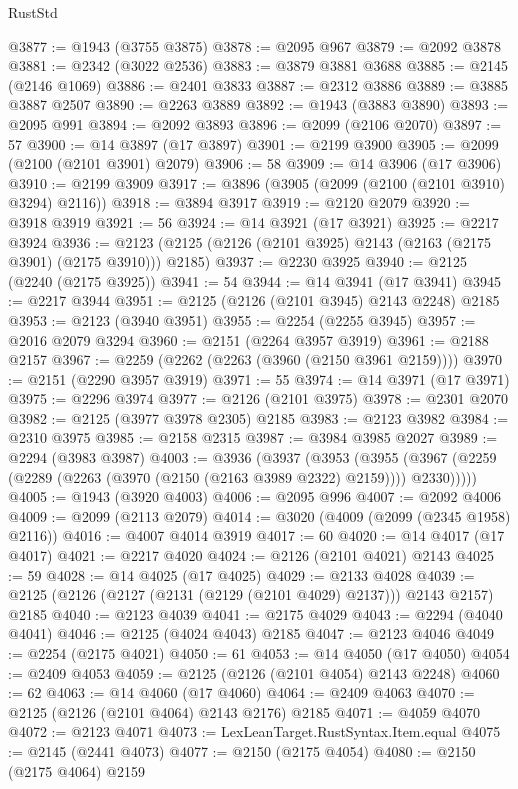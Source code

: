\begin{lexlean}{RustStd}
\begin{coremodule}
@3877 := @1943 (@3755 @3875)
@3878 := @2095 @967
@3879 := @2092 @3878
@3881 := @2342 (@3022 @2536)
@3883 := @3879 @3881 @3688
@3885 := @2145 (@2146 @1069)
@3886 := @2401 @3833
@3887 := @2312 @3886
@3889 := @3885 @3887 @2507
@3890 := @2263 @3889
@3892 := @1943 (@3883 @3890)
@3893 := @2095 @991
@3894 := @2092 @3893
@3896 := @2099 (@2106 @2070)
@3897 := 57
@3900 := @14 @3897 (@17 @3897)
@3901 := @2199 @3900
@3905 := @2099 (@2100 (@2101 @3901) @2079)
@3906 := 58
@3909 := @14 @3906 (@17 @3906)
@3910 := @2199 @3909
@3917 := @3896 (@3905 (@2099 (@2100 (@2101 @3910) @3294) @2116))
@3918 := @3894 @3917
@3919 := @2120 @2079
@3920 := @3918 @3919
@3921 := 56
@3924 := @14 @3921 (@17 @3921)
@3925 := @2217 @3924
@3936 := @2123 (@2125 (@2126 (@2101 @3925) @2143 (@2163 (@2175 @3901) (@2175 @3910))) @2185)
@3937 := @2230 @3925
@3940 := @2125 (@2240 (@2175 @3925))
@3941 := 54
@3944 := @14 @3941 (@17 @3941)
@3945 := @2217 @3944
@3951 := @2125 (@2126 (@2101 @3945) @2143 @2248) @2185
@3953 := @2123 (@3940 @3951)
@3955 := @2254 (@2255 @3945)
@3957 := @2016 @2079 @3294
@3960 := @2151 (@2264 @3957 @3919)
@3961 := @2188 @2157
@3967 := @2259 (@2262 (@2263 (@3960 (@2150 @3961 @2159))))
@3970 := @2151 (@2290 @3957 @3919)
@3971 := 55
@3974 := @14 @3971 (@17 @3971)
@3975 := @2296 @3974
@3977 := @2126 (@2101 @3975)
@3978 := @2301 @2070
@3982 := @2125 (@3977 @3978 @2305) @2185
@3983 := @2123 @3982
@3984 := @2310 @3975
@3985 := @2158 @2315
@3987 := @3984 @3985 @2027
@3989 := @2294 (@3983 @3987)
@4003 := @3936
    (@3937
      (@3953
        (@3955 (@3967 (@2259 (@2289 (@2263 (@3970 (@2150 (@2163 @3989 @2322) @2159)))) @2330)))))
@4005 := @1943 (@3920 @4003)
@4006 := @2095 @996
@4007 := @2092 @4006
@4009 := @2099 (@2113 @2079)
@4014 := @3020 (@4009 (@2099 (@2345 @1958) @2116))
@4016 := @4007 @4014 @3919
@4017 := 60
@4020 := @14 @4017 (@17 @4017)
@4021 := @2217 @4020
@4024 := @2126 (@2101 @4021) @2143
@4025 := 59
@4028 := @14 @4025 (@17 @4025)
@4029 := @2133 @4028
@4039 := @2125 (@2126 (@2127 (@2131 (@2129 (@2101 @4029) @2137))) @2143 @2157) @2185
@4040 := @2123 @4039
@4041 := @2175 @4029
@4043 := @2294 (@4040 @4041)
@4046 := @2125 (@4024 @4043) @2185
@4047 := @2123 @4046
@4049 := @2254 (@2175 @4021)
@4050 := 61
@4053 := @14 @4050 (@17 @4050)
@4054 := @2409 @4053
@4059 := @2125 (@2126 (@2101 @4054) @2143 @2248)
@4060 := 62
@4063 := @14 @4060 (@17 @4060)
@4064 := @2409 @4063
@4070 := @2125 (@2126 (@2101 @4064) @2143 @2176) @2185
@4071 := @4059 @4070
@4072 := @2123 @4071
@4073 := LexLeanTarget.RustSyntax.Item.equal
@4075 := @2145 (@2441 @4073)
@4077 := @2150 (@2175 @4054)
@4080 := @2150 (@2175 @4064) @2159

\end{coremodule}
\end{lexlean}
